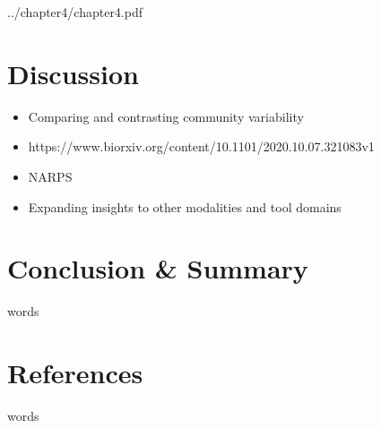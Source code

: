 \documentclass[fleqn,12pt]{SelfArx} %
\newcounter{secnonum}
\begin{document}
{}

            {../chapter4/chapter4.pdf}



\section{Discussion}
\begin{itemize}
\item Comparing and contrasting community variability
\item https://www.biorxiv.org/content/10.1101/2020.10.07.321083v1
\item NARPS
\item Expanding insights to other modalities and tool domains
\end{itemize}

\section{Conclusion \& Summary}
words

\section{References}
words




\end{document}
